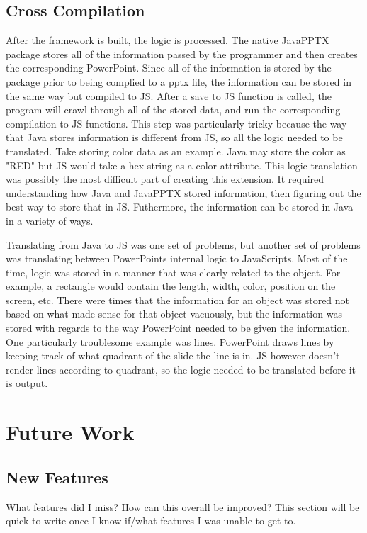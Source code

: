 \documentclass[12pt,twoside]{reedthesis}
\begin{document}
\subsection{Cross Compilation}
After the framework is built, the logic is processed. The native JavaPPTX package stores all of the information passed by the programmer and then creates the corresponding PowerPoint. Since all of the information is stored by the package prior to being complied to a pptx file, the information can be stored in the same way but compiled to JS. After a save to JS function is called, the program will crawl through all of the stored data, and run the corresponding compilation to JS functions. This step was particularly tricky because the way that Java stores information is different from JS, so all the logic needed to be translated. Take storing color data as an example. Java may store the color as "RED" but JS would take a hex string as a color attribute. This logic translation was possibly the most difficult part of creating this extension. It required understanding how Java and  JavaPPTX stored information, then figuring out the best way to store that in JS. Futhermore, the information can be stored in Java in a variety of ways. 

Translating from Java to JS was one set of problems, but another set of problems was translating between PowerPoints internal logic to JavaScripts. Most of the time, logic was stored in a manner that was clearly related to the object. For example, a rectangle would contain the length, width, color, position on the screen, etc. There were times that the information for an object was stored not based on what made sense for that object vacuously, but the information was stored with regards to the way PowerPoint needed to be given the information. One particularly troublesome example was lines. PowerPoint draws lines by keeping track of what quadrant of the slide the line is in. JS however doesn't render lines according to quadrant, so the logic needed to be translated before it is output. 

\section{Future Work}

\subsection{New Features}
What features did I miss? How can this overall be improved? This section will be quick to write once I know if/what features I was unable to get to. 
\end{document}
